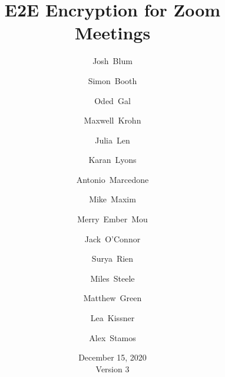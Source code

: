 \documentclass[11pt]{article}
\title{E2E Encryption for Zoom Meetings}
\author[1]{\small Josh~Blum}
\author[1]{\small Simon~Booth}
\author[1]{\small Oded~Gal}
\author[1]{\small Maxwell~Krohn}
\author[1]{\small Julia~Len}
\author[1]{\small Karan~Lyons}
\author[1]{\small Antonio~Marcedone}
\author[1]{\small Mike~Maxim}
\author[1]{\small Merry~Ember~Mou}
\author[1]{\small Jack~O'Connor}
\author[1]{\small Surya~Rien}
\author[1]{\small Miles~Steele}
\author[2]{\small Matthew~Green}
\author[  \hspace{-1ex}]{\small Lea~Kissner}
\author[3]{\small Alex~Stamos}
\affil[1]{\footnotesize Zoom~Video~Communications}
\affil[2]{\footnotesize Johns~Hopkins~University}
\affil[3]{\footnotesize Stanford~University}
\date{December 15, 2020 \\ \small Version 3}
\begin{document}
    \null  %
    \nointerlineskip  %
    \vfill
    \let\snewpage \newpage
    \let\newpage \relax
    \maketitle
    \thispagestyle{titlepage}
    \let \newpage \snewpage
    \vfill 
    \break %

    \tableofcontents
    \newpage
    \renewcommand{\thesection}{\arabic{section}}
    \renewcommand{\thesubsection}{\thesection.\arabic{subsection}}
    
    
    
    
    
    
    
    
    \pagebreak
    
    \newpage
    \appendix
    
    
\end{document}

